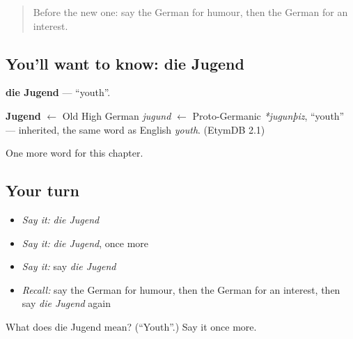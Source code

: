 \begin{quote}
Before the new one: say the German for humour, then the German for an interest.
\end{quote}

\subsection*{You'll want to know: die Jugend}
\textbf{die Jugend} — \textquotedblleft{}youth\textquotedblright{}.

\begin{cousinweb}
\textbf{Jugend} $\leftarrow$ Old High German \emph{jugund} $\leftarrow$ Proto-Germanic \emph{*jugunþiz}, \textquotedblleft{}youth\textquotedblright{} — inherited, the same word as English \emph{youth}. (EtymDB 2.1)
\end{cousinweb}

\begin{grammarlens}[title={What you've built}]
One more word for this chapter.
\end{grammarlens}

\subsection*{Your turn}
\begin{itemize}
\raggedright
  \item \emph{Say it:} \emph{die Jugend}
  \item \emph{Say it:} \emph{die Jugend}, once more
  \item \emph{Say it:} say \emph{die Jugend}
  \item \emph{Recall:} say the German for humour, then the German for an interest, then say \emph{die Jugend} again
\end{itemize}

\begin{tcolorbox}[breakable,colback=teal!4,colframe=teal!35!black,title={Before you move on}]
What does die Jugend mean? (\textquotedblleft{}Youth\textquotedblright{}.) Say it once more.
\end{tcolorbox}
